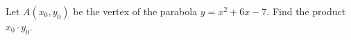 Let $A(x_{0},y_{0})$ be the vertex of the parabola $y=x^{2}+6x-7$. Find the product $x_{0} \cdot y_{0}$.
